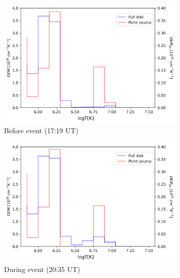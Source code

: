 \begin{figure}[h!]

    \begin{subfigure}[b]{0.3\textwidth}
        \centering
        \includegraphics[width=\textwidth]{images/dem_profile_before_event_2012_aug_31.png}
        \caption{Before event (17:19 UT)}
        \label{fig:dem_pro_aug_31_2012_a}
    \end{subfigure}
    \hfill
    \begin{subfigure}[b]{0.3\textwidth}
        \centering
        \includegraphics[width=\textwidth]{images/dem_profile_during_event_2012_aug_31.png}
        \caption{During event (20:35 UT)}
        \label{fig:dem_pro_aug_31_2012_b}
    \end{subfigure}
    \hfill
    \begin{subfigure}[b]{0.3\textwidth}

\end{subfigure}
\end{figure}
